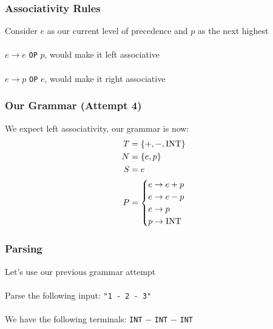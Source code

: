 \documentclass[aspectratio=169]{beamer}
\begin{document}
\begin{frame}
\frametitle{Associativity Rules}

Consider $e$ as our current level of precedence and $p$ as the next highest\\~\\

$e \rightarrow e$ \lstinline{OP} $p$, would make it left associative\\~\\

$e \rightarrow p$ \lstinline{OP} $e$, would make it right associative
\end{frame}

\begin{frame}
\frametitle{Our Grammar (Attempt 4)}

We expect left associativity, our grammar is now:
\begin{align*}
T &= \{ +, -, \text{\lstinline{INT}} \}\\
N &= \{ e, p \}\\
S &= e\\
P &= \begin{cases}e \rightarrow e + p \\
     e \rightarrow e - p\\
     e \rightarrow p\\
     p \rightarrow \text{\lstinline{INT}}\end{cases}
\end{align*}
\end{frame}

\begin{frame}
\frametitle{Parsing}

Let's use our previous grammar attempt\\~\\

Parse the following input: \lstinline{"1 - 2 - 3"}\\~\\

We have the following terminals: \lstinline{INT} $-$ \lstinline{INT} $-$
\lstinline{INT}
\end{frame}
\end{document}
